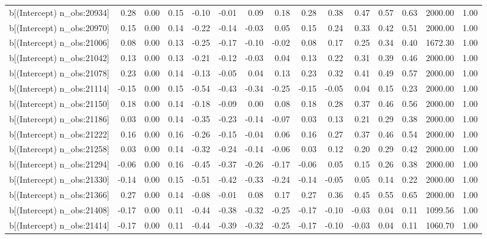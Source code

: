 \begin{table}[ht]
\begin{tabular}{rrrrrrrrrrrrrrr}
  b[(Intercept) n\_obs:20934] & 0.28 & 0.00 & 0.15 & -0.10 & -0.01 & 0.09 & 0.18 & 0.28 & 0.38 & 0.47 & 0.57 & 0.63 & 2000.00 & 1.00 \\ 
  b[(Intercept) n\_obs:20970] & 0.15 & 0.00 & 0.14 & -0.22 & -0.14 & -0.03 & 0.05 & 0.15 & 0.24 & 0.33 & 0.42 & 0.51 & 2000.00 & 1.00 \\ 
  b[(Intercept) n\_obs:21006] & 0.08 & 0.00 & 0.13 & -0.25 & -0.17 & -0.10 & -0.02 & 0.08 & 0.17 & 0.25 & 0.34 & 0.40 & 1672.30 & 1.00 \\ 
  b[(Intercept) n\_obs:21042] & 0.13 & 0.00 & 0.13 & -0.21 & -0.12 & -0.03 & 0.04 & 0.13 & 0.22 & 0.31 & 0.39 & 0.46 & 2000.00 & 1.00 \\ 
  b[(Intercept) n\_obs:21078] & 0.23 & 0.00 & 0.14 & -0.13 & -0.05 & 0.04 & 0.13 & 0.23 & 0.32 & 0.41 & 0.49 & 0.57 & 2000.00 & 1.00 \\ 
  b[(Intercept) n\_obs:21114] & -0.15 & 0.00 & 0.15 & -0.54 & -0.43 & -0.34 & -0.25 & -0.15 & -0.05 & 0.04 & 0.15 & 0.23 & 2000.00 & 1.00 \\ 
  b[(Intercept) n\_obs:21150] & 0.18 & 0.00 & 0.14 & -0.18 & -0.09 & 0.00 & 0.08 & 0.18 & 0.28 & 0.37 & 0.46 & 0.56 & 2000.00 & 1.00 \\ 
  b[(Intercept) n\_obs:21186] & 0.03 & 0.00 & 0.14 & -0.35 & -0.23 & -0.14 & -0.07 & 0.03 & 0.13 & 0.21 & 0.29 & 0.38 & 2000.00 & 1.00 \\ 
  b[(Intercept) n\_obs:21222] & 0.16 & 0.00 & 0.16 & -0.26 & -0.15 & -0.04 & 0.06 & 0.16 & 0.27 & 0.37 & 0.46 & 0.54 & 2000.00 & 1.00 \\ 
  b[(Intercept) n\_obs:21258] & 0.03 & 0.00 & 0.14 & -0.32 & -0.24 & -0.14 & -0.06 & 0.03 & 0.12 & 0.20 & 0.29 & 0.42 & 2000.00 & 1.00 \\ 
  b[(Intercept) n\_obs:21294] & -0.06 & 0.00 & 0.16 & -0.45 & -0.37 & -0.26 & -0.17 & -0.06 & 0.05 & 0.15 & 0.26 & 0.38 & 2000.00 & 1.00 \\ 
  b[(Intercept) n\_obs:21330] & -0.14 & 0.00 & 0.15 & -0.51 & -0.42 & -0.33 & -0.24 & -0.14 & -0.05 & 0.05 & 0.14 & 0.22 & 2000.00 & 1.00 \\ 
  b[(Intercept) n\_obs:21366] & 0.27 & 0.00 & 0.14 & -0.08 & -0.01 & 0.08 & 0.17 & 0.27 & 0.36 & 0.45 & 0.55 & 0.65 & 2000.00 & 1.00 \\ 
  b[(Intercept) n\_obs:21408] & -0.17 & 0.00 & 0.11 & -0.44 & -0.38 & -0.32 & -0.25 & -0.17 & -0.10 & -0.03 & 0.04 & 0.11 & 1099.56 & 1.00 \\ 
  b[(Intercept) n\_obs:21414] & -0.17 & 0.00 & 0.11 & -0.44 & -0.39 & -0.32 & -0.25 & -0.17 & -0.10 & -0.03 & 0.04 & 0.11 & 1060.70 & 1.00 \\ 

\end{tabular}
\end{table}
